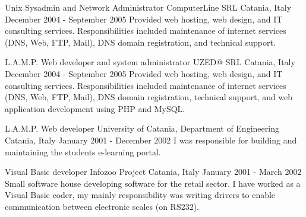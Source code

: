 \begin{cventries}
  \cventry
  {Unix Sysadmin and Network Administrator}
  {ComputerLine SRL}
  {Catania, Italy}
  {December 2004 - September 2005}
  {
    Provided web hosting, web design, and IT consulting services. Responsibilities included maintenance of internet services (DNS, Web, FTP, Mail), DNS domain registration, and technical support.
  }

  \cventry
  {L.A.M.P. Web developer and system administrator}
  {UZED@ SRL}
  {Catania, Italy}
  {December 2004 - September 2005}
  {
    Provided web hosting, web design, and IT consulting services. Responsibilities included maintenance of internet services (DNS, Web, FTP, Mail), DNS domain registration, technical support, and web application development using PHP and MySQL.
  }

  \cventry
  {L.A.M.P. Web developer}
  {University of Catania, Department of Engineering}
  {Catania, Italy}
  {January 2001 - December 2002}
  {
    I was responsible for building and maintaining the students e-learning portal.
  }

  \cventry
  {Visual Basic developer}
  {Infozoo Project}
  {Catania, Italy}
  {January 2001 - March 2002}
  {
    Small software house developing software for the retail sector.
    I have worked as a Visual Basic coder, my mainly responsibility was writing drivers to enable
    communication between electronic scales (on RS232).
  }

\end{cventries}
